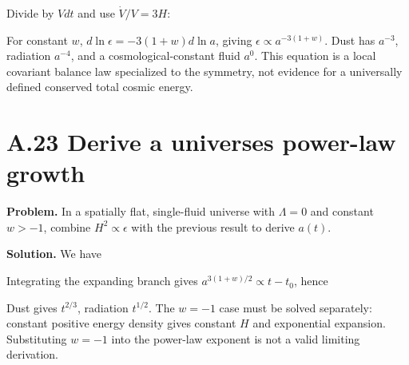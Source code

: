 \documentclass[
  11pt,
  letterpaper,
  oneside,
  openany]{scrbook}
\begin{document}
Divide by \(Vdt\) and use \(\dot V/V=3H\):

\begin{center}
\begingroup
{}
\ifdim\wd\grmathbox>\linewidth
\resizebox{\linewidth}{!}{\usebox{\grmathbox}}
\else\usebox{\grmathbox}\fi
\endgroup
\end{center}

For constant \(w\), \(d\ln\epsilon=-3(1+w)d\ln a\), giving
\(\epsilon\propto a^{-3(1+w)}\). Dust has \(a^{-3}\), radiation
\(a^{-4}\), and a cosmological-constant fluid \(a^0\). This equation is
a local covariant balance law specialized to the symmetry, not evidence
for a universally defined conserved total cosmic energy.

\hypertarget{a.23-derive-a-universes-power-law-growth}{%
\section{A.23 Derive a universe\textquotesingle s power-law
growth}\label{a.23-derive-a-universes-power-law-growth}}

\textbf{Problem.} In a spatially flat, single-fluid universe with
\(\Lambda=0\) and constant \(w>-1\), combine \(H^2\propto\epsilon\) with
the previous result to derive \(a(t)\).

\textbf{Solution.} We have

\begin{center}
\begingroup
{}
\ifdim\wd\grmathbox>\linewidth
\resizebox{\linewidth}{!}{\usebox{\grmathbox}}
\else\usebox{\grmathbox}\fi
\endgroup
\end{center}

Integrating the expanding branch gives \(a^{3(1+w)/2}\propto t-t_0\),
hence

\begin{center}
\begingroup
{}
\ifdim\wd\grmathbox>\linewidth
\resizebox{\linewidth}{!}{\usebox{\grmathbox}}
\else\usebox{\grmathbox}\fi
\endgroup
\end{center}

Dust gives \(t^{2/3}\), radiation \(t^{1/2}\). The \(w=-1\) case must be
solved separately: constant positive energy density gives constant \(H\)
and exponential expansion. Substituting \(w=-1\) into the power-law
exponent is not a valid limiting derivation.
\end{document}
